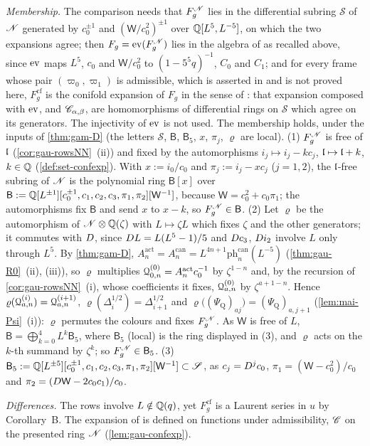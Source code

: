\emph{Membership.} The comparison needs that $F_g^{\mathscr{N}}$ lies in the differential subring $\mathscr S$ of $\mathscr{N}$ generated by $c_0^{\pm1}$ and $(\mathsf W/c_0^2)^{\pm1}$ over $\mathbb{Q}[L^5,L^{-5}]$, on which the two expansions agree; then $F_g=\operatorname{ev}(F_g^{\mathscr{N}})$ lies in the algebra of \cite[Def.~1.1]{CGYZ26} as recalled above, since $\operatorname{ev}$ maps $L^5$, $c_0$ and $\mathsf W/c_0^2$ to $(1-5^5q)^{-1}$, $C_0$ and $C_1$; and for every frame whose pair $(\varpi_0,\varpi_1)$ is admissible, which is asserted in \cite[Ex.~1.3, Rem.~1.4]{CGYZ26} and is not proved here, $F_g^{\mathrm{cf}}$ is the conifold expansion of $F_g$ in the sense of \cite[Def.~1.2]{CGYZ26}: that expansion composed with $\operatorname{ev}$, and $\mathscr{C}_{\alpha,\beta}$, are homomorphisms of differential rings on $\mathscr S$ which agree on its generators. The injectivity of $\operatorname{ev}$ is not used. The membership holds, under the inputs of \cref{thm:gam-D} (the letters $\mathscr S$, $\mathsf B$, $\mathsf B_5$, $x$, $\pi_j$, $\varrho$ are local). (1) $F_g^{\mathscr{N}}$ is free of $\mathfrak{l}$ (\cref{cor:gau-rowsNN}~(ii)) and fixed by the automorphisms $i_j\mapsto i_j-kc_j$, $\mathfrak{l}\mapsto\mathfrak{l}+k$, $k\in\mathbb{Q}$ (\cref{def:set-confexp}). With $x:=i_0/c_0$ and $\pi_j:=i_j-xc_j$ ($j=1,2$), the $\mathfrak{l}$-free subring of $\mathscr{N}$ is the polynomial ring $\mathsf B[x]$ over $\mathsf B:=\mathbb{Q}[L^{\pm1}][c_0^{\pm1},c_1,c_2,c_3,\pi_1,\pi_2][\mathsf W^{-1}]$, because $\mathsf W=c_0^2+c_0\pi_1$; the automorphisms fix $\mathsf B$ and send $x$ to $x-k$, so $F_g^{\mathscr{N}}\in\mathsf B$. (2) Let $\varrho$ be the automorphism of $\mathscr{N}\otimes\mathbb{Q}(\zeta)$ with $L\mapsto\zeta L$ which fixes $\zeta$ and the other generators; it commutes with $D$, since $D L=L(L^5-1)/5$ and $D c_3$, $D i_2$ involve $L$ only through $L^5$. By \cref{thm:gam-D}, $A^{\mathrm{act}}_n=A^{\mathrm{can}}_n=L^{4n+1}\mathrm{ph}^{\mathrm{can}}_n(L^{-5})$ (\cref{thm:gau-R0}~(ii), (iii)), so $\varrho$ multiplies $\mathcal{Q}^{(0)}_{0,n}=A^{\mathrm{act}}_nc_0^{-1}$ by $\zeta^{1-n}$ and, by the recursion of \cref{cor:gau-rowsNN}~(i), whose coefficients it fixes, $\mathcal{Q}^{(0)}_{a,n}$ by $\zeta^{a+1-n}$. Hence $\varrho(\mathcal{Q}^{(i)}_{a,n})=\mathcal{Q}^{(i+1)}_{a,n}$, $\varrho(\Delta_i^{1/2})=\Delta_{i+1}^{1/2}$ and $\varrho\bigl((\Psi_{\mathrm Q})_{aj}\bigr)=(\Psi_{\mathrm Q})_{a,j+1}$ (\cref{lem:mai-Psi}~(i)): $\varrho$ permutes the colours and fixes $F_g^{\mathscr{N}}$. As $\mathsf W$ is free of $L$, $\mathsf B=\bigoplus_{k=0}^4L^k\mathsf B_5$, where $\mathsf B_5$ (local) is the ring displayed in (3), and $\varrho$ acts on the $k$-th summand by $\zeta^k$; so $F_g^{\mathscr{N}}\in\mathsf B_5$. (3) $\mathsf B_5:=\mathbb{Q}[L^{\pm5}][c_0^{\pm1},c_1,c_2,c_3,\pi_1,\pi_2][\mathsf W^{-1}]\subset\mathscr S$, as $c_j=D^jc_0$, $\pi_1=(\mathsf W-c_0^2)/c_0$ and $\pi_2=(D\mathsf W-2c_0c_1)/c_0$.

\emph{Differences.} The rows involve $L\notin\mathbb{Q}(q)$, yet $F_g^{\mathrm{cf}}$ is a Laurent series in $u$ by Corollary~B. The expansion of \cite{CGYZ26} is defined on functions under admissibility, $\mathscr{C}$ on the presented ring $\mathscr{N}$ (\cref{lem:gau-confexp}).
